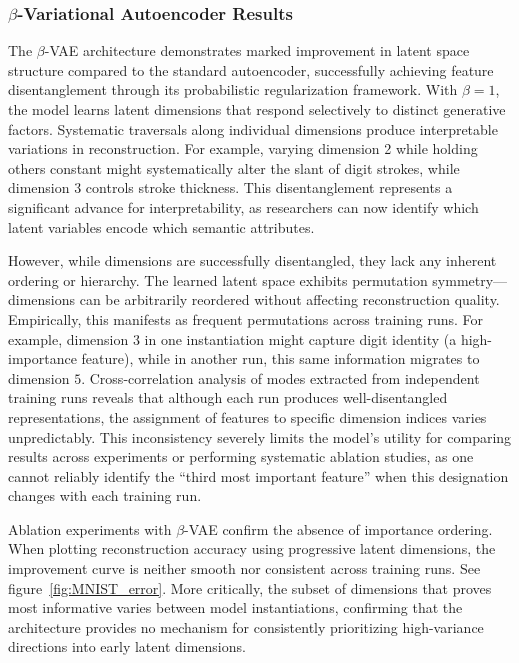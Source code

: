 \documentclass[twoside,11pt]{article}
\begin{document}
\subsubsection*{$\beta$-Variational Autoencoder Results} The $\beta$-VAE architecture demonstrates marked improvement in latent space structure compared to the standard autoencoder, successfully achieving feature disentanglement through its probabilistic regularization framework. With $\beta=1$, the model learns latent dimensions that respond selectively to distinct generative factors. Systematic traversals along individual dimensions produce interpretable variations in reconstruction. For example, varying dimension 2 while holding others constant might systematically alter the slant of digit strokes, while dimension 3 controls stroke thickness. This disentanglement represents a significant advance for interpretability, as researchers can now identify which latent variables encode which semantic attributes.

However, while dimensions are successfully disentangled, they lack any inherent ordering or hierarchy. The learned latent space exhibits permutation symmetry—dimensions can be arbitrarily reordered without affecting reconstruction quality. Empirically, this manifests as frequent permutations across training runs. For example, dimension $3$ in one instantiation might capture digit identity (a high-importance feature), while in another run, this same information migrates to dimension $5$. Cross-correlation analysis of modes extracted from independent training runs reveals that although each run produces well-disentangled representations, the assignment of features to specific dimension indices varies unpredictably. This inconsistency severely limits the model's utility for comparing results across experiments or performing systematic ablation studies, as one cannot reliably identify the ``third most important feature'' when this designation changes with each training run.

Ablation experiments with $\beta$-VAE confirm the absence of importance ordering. When plotting reconstruction accuracy using progressive latent dimensions, the improvement curve is neither smooth nor consistent across training runs. See figure~\ref{fig:MNIST_error}. More critically, the subset of dimensions that proves most informative varies between model instantiations, confirming that the architecture provides no mechanism for consistently prioritizing high-variance directions into early latent dimensions.
\end{document}

